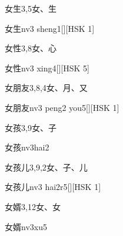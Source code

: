 \begin{entry}{女生}{3,5}{⼥、⽣}
  \begin{phonetics}{女生}{nv3 sheng1}[][HSK 1]
  \end{phonetics}
\end{entry}

\begin{entry}{女性}{3,8}{⼥、⼼}
  \begin{phonetics}{女性}{nv3 xing4}[][HSK 5]
  \end{phonetics}
\end{entry}

\begin{entry}{女朋友}{3,8,4}{⼥、⽉、⼜}
  \begin{phonetics}{女朋友}{nv3 peng2 you5}[][HSK 1]
  \end{phonetics}
\end{entry}

\begin{entry}{女孩}{3,9}{⼥、⼦}
  \begin{phonetics}{女孩}{nv3hai2}
  \end{phonetics}
\end{entry}

\begin{entry}{女孩儿}{3,9,2}{⼥、⼦、⼉}
  \begin{phonetics}{女孩儿}{nv3 hai2r5}[][HSK 1]
  \end{phonetics}
\end{entry}

\begin{entry}{女婿}{3,12}{⼥、⼥}
  \begin{phonetics}{女婿}{nv3xu5}
  \end{phonetics}
\end{entry}

